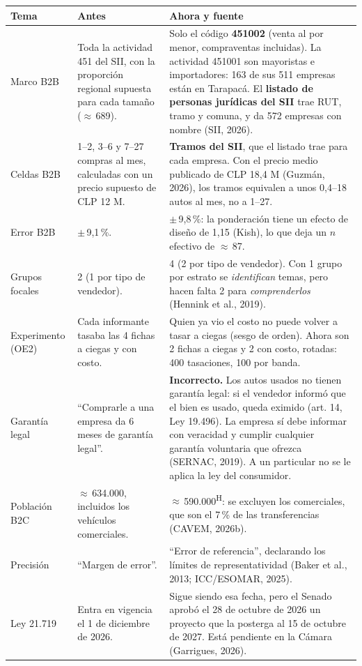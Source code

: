 \documentclass[11pt,a4paper]{article}
\newcommand{\hyp}{\textsuperscript{\textsf{\scriptsize H}}}
\begin{document}
{\small
\begin{xltabular}{\textwidth}{@{}p{3.0cm}LL@{}}
\toprule
\textbf{Tema} & \textbf{Antes} & \textbf{Ahora y fuente}\\
\midrule
\endhead
Marco B2B & Toda la actividad 451 del SII, con la proporción regional supuesta para cada tamaño ($\approx$\,689). & Solo el código \textbf{451002} (venta al por menor, compraventas incluidas). La actividad 451001 son mayoristas e importadores: 163 de sus 511 empresas están en Tarapacá. El \textbf{listado de personas jurídicas del SII} trae RUT, tramo y comuna, y da 572 empresas con nombre (SII, 2026). \\
Celdas B2B & 1–2, 3–6 y 7–27 compras al mes, calculadas con un precio supuesto de CLP 12 M. & \textbf{Tramos del SII}, que el listado trae para cada empresa. Con el precio medio publicado de CLP 18,4 M (Guzmán, 2026), los tramos equivalen a unos 0,4–18 autos al mes, no a 1–27. \\
Error B2B & $\pm$\,9,1\,\%. & $\pm$\,9,8\,\%: la ponderación tiene un efecto de diseño de 1,15 (Kish), lo que deja un $n$ efectivo de $\approx$\,87. \\
Grupos focales & 2 (1 por tipo de vendedor). & 4 (2 por tipo de vendedor). Con 1 grupo por estrato se \emph{identifican} temas, pero hacen falta 2 para \emph{comprenderlos} (Hennink et al., 2019). \\
Experimento (OE2) & Cada informante tasaba las 4 fichas a ciegas y con costo. & Quien ya vio el costo no puede volver a tasar a ciegas (sesgo de orden). Ahora son 2 fichas a ciegas y 2 con costo, rotadas: 400 tasaciones, 100 por banda. \\
Garantía legal & \enquote{Comprarle a una empresa da 6 meses de garantía legal}. & \textbf{Incorrecto.} Los autos usados no tienen garantía legal: si el vendedor informó que el bien es usado, queda eximido (art. 14, Ley 19.496). La empresa sí debe informar con veracidad y cumplir cualquier garantía voluntaria que ofrezca (SERNAC, 2019). A un particular no se le aplica la ley del consumidor. \\
Población B2C & $\approx$\,634.000, incluidos los vehículos comerciales. & $\approx$\,590.000\hyp: se excluyen los comerciales, que son el 7\,\% de las transferencias (CAVEM, 2026b). \\
Precisión & \enquote{Margen de error}. & \enquote{Error de referencia}, declarando los límites de representatividad (Baker et al., 2013; ICC/ESOMAR, 2025). \\
Ley 21.719 & Entra en vigencia el 1 de diciembre de 2026. & Sigue siendo esa fecha, pero el Senado aprobó el 28 de octubre de 2026 un proyecto que la posterga al 15 de octubre de 2027. Está pendiente en la Cámara (Garrigues, 2026). \\
\bottomrule
\end{xltabular}}
\end{document}

